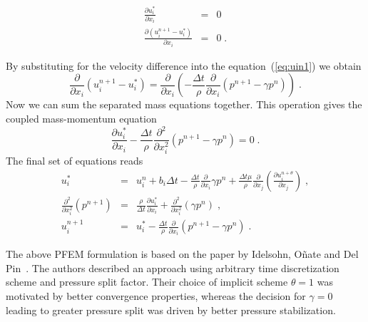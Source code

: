 \documentclass[a4paper]{article}
\newcommand{\pard}[2]{\frac{\partial{#1}}{\partial{#2}}}
\begin{document}
\begin{eqnarray}\label{rce:mass}
	\pard{u^*_i}{x_i} &=& 0 \\
      \pard{(u^{n+1}_i-u^*_i)}{x_i} &=& 0\;.
\end{eqnarray}

By substituting for the velocity difference into the equation~(\ref{eq:uin1}) we obtain
\begin{equation}
\pard{}{x_i}(u^{n+1}_i - u^*_i) = \pard{}{x_i}\left(-\frac{\Delta t}{\rho}\pard{}{x_i}(p^{n+1}-\gamma p^n)\right)\;.
\end{equation}
Now we can sum the separated mass equations together. This operation gives the coupled mass-momentum equation
\begin{equation}
  \pard{u^*_i}{x_i} - \frac{\Delta t}{\rho}\frac{\partial^2}{\partial x^2_i}(p^{n+1}-\gamma p^n) = 0\;.
\end{equation}
The final set of equations reads
\begin{eqnarray}
u^*_i  &=& u^n_i+b_i\Delta t - \frac{\Delta t}{\rho}\pard{}{x_i}\gamma p^n+\frac{\Delta t\mu}{\rho}\pard{}{x_j}\left(\pard{u^{n+\theta}_i}{x_j}\right)\;,\\
\frac{\partial^2}{\partial x^2_i}(p^{n+1}) &=& \frac{\rho}{\Delta t}\pard{u^*_i}{x_i}+\frac{\partial^2}{\partial x^2_i}(\gamma p^n)\;, \\
u^{n+1}_i &=& u^*_i- \frac{\Delta t}{\rho}\pard{}{x_i}(p^{n+1}-\gamma p^n)\;.
\end{eqnarray}
\par
The above PFEM formulation is based on the paper by Idelsohn, O\~nate and Del Pin~\cite{Idelsohn04}. The authors described an approach using arbitrary time discretization scheme and pressure split factor. Their choice of implicit scheme $\theta = 1$ was motivated by better convergence properties, whereas the decision for $\gamma = 0$ leading to greater pressure split was driven by better pressure stabilization.
\end{document}
